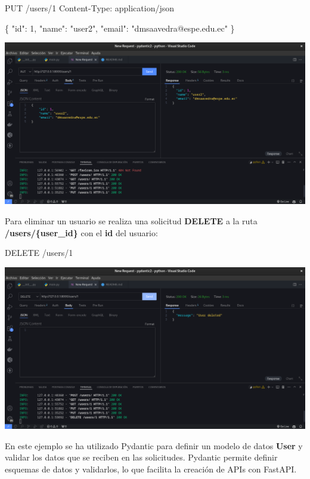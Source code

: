\documentclass[
  a4paper,
  DIV=11,
  numbers=noendperiod,
  onepage,
  openany]{scrreprt}
\newenvironment{Shaded}{\begin{snugshade}}{\end{snugshade}}
\newcommand{\NormalTok}[1]{\textcolor[rgb]{0.00,0.23,0.31}{#1}}
\begin{document}
\begin{Shaded}
\begin{Highlighting}[]
\NormalTok{PUT /users/1}
\NormalTok{Content{-}Type: application/json}

\NormalTok{\{}
\NormalTok{    "id": 1,}
\NormalTok{    "name": "user2",}
\NormalTok{    "email": "dmsaavedra@espe.edu.ec"}
\NormalTok{\}}
\end{Highlighting}
\end{Shaded}

\includegraphics{unidades/unidad5/images/paste-24.png}

Para eliminar un usuario se realiza una solicitud \textbf{DELETE} a la
ruta \textbf{/users/\{user\_id\}} con el \textbf{id} del usuario:

\begin{Shaded}
\begin{Highlighting}[]
\NormalTok{DELETE /users/1}
\end{Highlighting}
\end{Shaded}

\includegraphics{unidades/unidad5/images/paste-25.png}

En este ejemplo se ha utilizado Pydantic para definir un modelo de datos
\textbf{User} y validar los datos que se reciben en las solicitudes.
Pydantic permite definir esquemas de datos y validarlos, lo que facilita
la creación de APIs con FastAPI.
\end{document}
